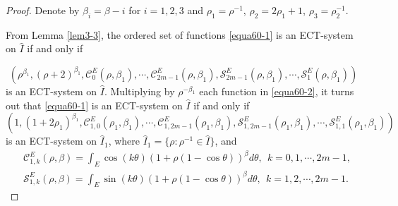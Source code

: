 \documentclass[11pt]{amsart}
\theoremstyle{remark}
\theoremstyle{definition}
\begin{document}
\begin{proof}
Denote by $\beta_i=\beta-i$ for $i=1,2,3$ and $\rho_1=\rho^{-1}$, $\rho_2=2\rho_1+1$, $\rho_3=\rho_2^{-1}$.

From Lemma \ref{lem3-3}, the ordered set of functions  \eqref{equa60-1} is  an ECT-system on   $\hat{I}$ if and only if

\begin{equation} \label{equa60-2}\left(\rho^{\beta_1}, (\rho+2)^{\beta_1}, \mathcal{C}_{0}^{E}(\rho,\beta_1), \cdots, \mathcal{C}_{2m-1}^{E}(\rho,\beta_1), \mathcal{S}_{2m-1}^{E}(\rho,\beta_1), \cdots, \mathcal{S}_{1}^{E}(\rho,\beta_1)\right) \end{equation}
is an ECT-system on   $\hat{I}$. Multiplying   by $\rho^{-\beta_1}$ each function in \eqref{equa60-2}, it turns out  that \eqref{equa60-1} is  an ECT-system on   $\hat{I}$ if and only if
\begin{equation} \label{equa60-3}\left(1, (1+2\rho_1)^{\beta_1}, \mathcal{C}_{1,0}^{E}(\rho_1,\beta_1), \cdots, \mathcal{C}_{1,2m-1}^{E}(\rho_1,\beta_1), \mathcal{S}_{1,2m-1}^{E}(\rho_1,\beta_1), \cdots, \mathcal{S}_{1,1}^{E}(\rho_1,\beta_1)\right) \end{equation}
is  an ECT-system on   $\hat{I}_1$,  where $\hat{I}_1=\{ \rho:  \rho^{-1}\in \hat{I} \}$,  and
 \begin{equation*}
\begin{split}
&\mathcal{C}_{1,k}^{E}(\rho,\beta)=\int_{E}\cos (k\theta)\left(1+\rho(1-\cos\theta)\right)^{\beta}d\theta,\ \ k=0,1, \cdots, 2m-1, \\
&\mathcal{S}_{1,k}^{E}(\rho,\beta)=\int_{E}\sin (k\theta)\left(1+\rho(1-\cos\theta)\right)^{\beta}d\theta, \ \ k=1, 2,  \cdots, 2m-1.
\end{split}
\end{equation*}


\end{proof}
\end{document}
